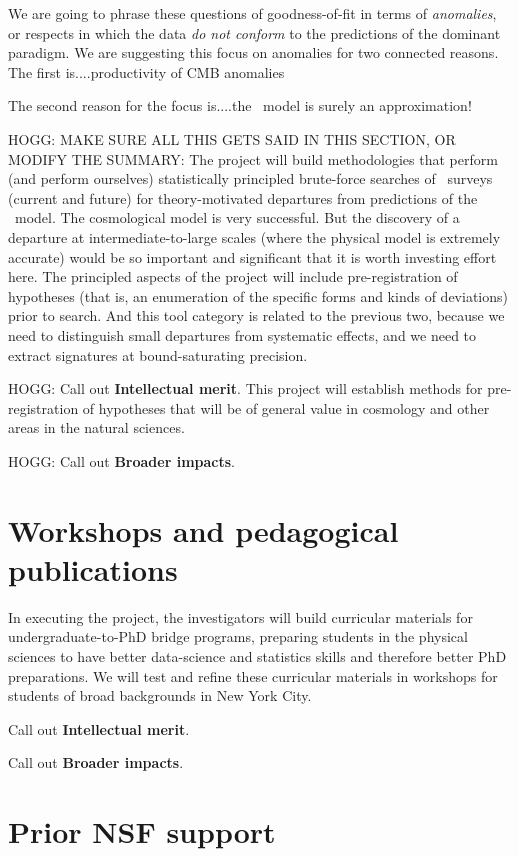 \documentclass[12pt, fullpage, letterpaper]{article}
\begin{document}
We are going to phrase these questions of goodness-of-fit in terms of
\emph{anomalies}, or respects in which the data \emph{do not conform}
to the predictions of the dominant paradigm.
We are suggesting this focus on anomalies for two connected reasons.
The first is....productivity of CMB anomalies

The second reason for the focus is....the \LCDM\ model is surely an
approximation!

HOGG: MAKE SURE ALL THIS GETS SAID IN THIS SECTION, OR MODIFY THE SUMMARY:
The project will build methodologies that perform (and perform
ourselves) statistically principled brute-force searches of \LSS\ 
surveys (current and future) for theory-motivated departures from
predictions of the \LCDM\ model.
The cosmological model is very successful.
But the discovery of a departure at intermediate-to-large scales
(where the physical model is extremely accurate) would be so important
and significant that it is worth investing effort here.
The principled aspects of the project will include pre-registration of
hypotheses (that is, an enumeration of the specific forms and kinds of
deviations) prior to search.
And this tool category is related to the previous two, because we need
to distinguish small departures from systematic effects, and we need
to extract signatures at bound-saturating precision.

HOGG: Call out \textbf{Intellectual merit}.
This project will establish methods for pre-registration of hypotheses that
will be of general value in cosmology and other areas in the natural
sciences.

HOGG: Call out \textbf{Broader impacts}.

\section{Workshops and pedagogical publications}

In executing the project, the investigators will build curricular
materials for undergraduate-to-PhD bridge programs, preparing students
in the physical sciences to have better data-science and statistics
skills and therefore better PhD preparations.
We will test and refine these curricular materials in workshops for
students of broad backgrounds in New York City.

Call out \textbf{Intellectual merit}.

Call out \textbf{Broader impacts}.

\section{Prior NSF support}
\end{document}
